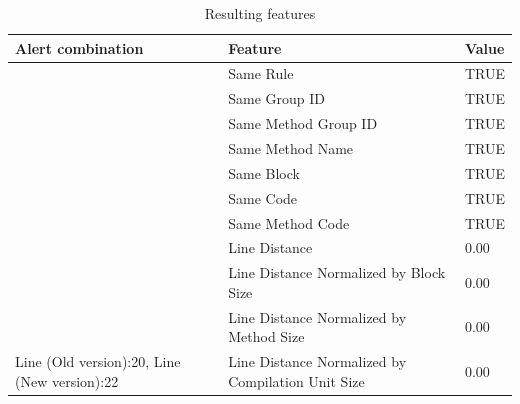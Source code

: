 \documentclass[
]{article}
\begin{document}
\small

\begin{table}[!h]

\caption{\label{tab:unnamed-chunk-6}Resulting features\label{table_features} }
\centering
\begin{tabular}[t]{l|l|l}
\hline
Alert combination & Feature & Value\\
\hline
\rowcolor{gray!6}   & Same Rule & TRUE\\

 & Same Group ID & TRUE\\

\rowcolor{gray!6}   & Same Method Group ID & TRUE\\

 & Same Method Name & TRUE\\

\rowcolor{gray!6}   & Same Block & TRUE\\

 & Same Code & TRUE\\

\rowcolor{gray!6}   & Same Method Code & TRUE\\

 & Line Distance & 0.00\\

\rowcolor{gray!6}   & Line Distance Normalized by Block Size & 0.00\\

 & Line Distance Normalized by Method Size & 0.00\\

\multirow[t]{-11}{*}{\raggedright\arraybackslash Line (Old version):20, Line (New version):22} & Line Distance Normalized by Compilation Unit Size & 0.00\\
\hline
\end{tabular}
\end{table}

\normalsize

\small

\normalsize

\newpage
\end{document}
